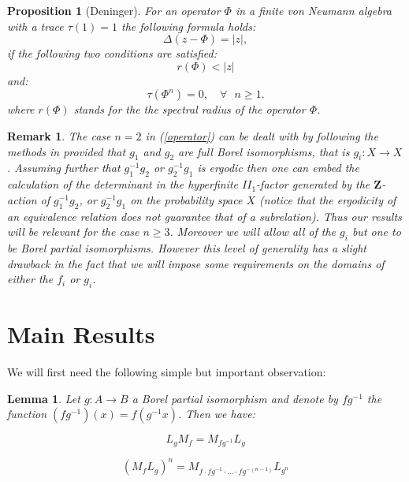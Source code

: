 \documentclass[12pt]{amsart}
\newtheorem{proposition}[teo]{Proposition}
\newtheorem{lemma}[teo]{Lemma}
\newtheorem{remark}[teo]{Remark}
\numberwithin{equation}{section}
\begin{document}
\begin{proposition}[Deninger]\label{Deninger}
For an operator $\Phi$ in a finite von Neumann algebra with a trace $\tau(1)=1$ the following formula holds:
\begin{equation}
\Delta(z-\Phi)=|z|,
\end{equation}
if the following two conditions are satisfied:
\begin{equation}\label{spectral radius}
r(\Phi)<|z|
\end{equation}
and:
\begin{equation}\label{zero trace}
\tau(\Phi^n)=0,\quad \forall\mbox{ }n\geq 1.
\end{equation}
where $r(\Phi)$ stands for the the spectral radius of the operator $\Phi$.
\end{proposition}
\begin{remark}
The case $n=2$ in (\ref{operator}) can be dealt with by following the methods in \cite{Den1} provided that $g_1$ and $g_2$ are full Borel isomorphisms, that is $g_i:X\rightarrow X$. Assuming further that $g_1^{-1}g_2$ or $g_2^{-1}g_1$ is ergodic then one can embed the calculation of the determinant in the hyperfinite $II_1$-factor generated by the $\mathbf{Z}$-action of $g_1^{-1}g_2$, or $g_2^{-1}g_1$ on the probability space $X$ (notice that the ergodicity of an equivalence relation does not guarantee that of a subrelation). Thus our results will be relevant for the case $n\geqslant 3$. Moreover we will allow all of the $g_i$ but one to be Borel partial isomorphisms. However this level of generality has a slight drawback in the fact that we will impose some requirements on the domains of either the  $f_i$ or $g_i$. 
\end{remark}
\section{Main Results}
We will first need the following simple but important observation:
\begin{lemma}
Let $g:A\rightarrow B$ a Borel partial isomorphism and denote by $fg^{-1}$ the function $(fg^{-1})(x)=f(g^{-1}x)$. Then we have:

\begin{equation} \label{commutation}
L_{g}M_f=M_{fg^{-1}}L_{g}
\end{equation}

\begin{equation} \label{pow}
(M_fL_g)^n=M_{f\cdot fg^{-1}\cdot ...\cdot fg^{-(n-1)}}L_{g^n}
\end{equation}
\end{lemma}
\end{document}
